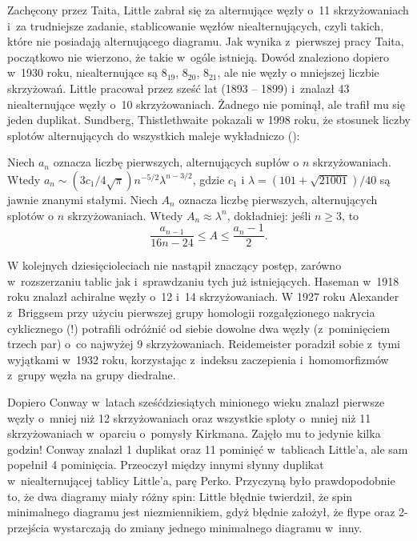 {Zachęcony przez Taita, Little zabrał się za alternujące węzły o~11 skrzyżowaniach i~za trudniejsze zadanie, stablicowanie węzłów niealternujących, czyli takich, które nie posiadają alternującego diagramu.
Jak wynika z~pierwszej pracy Taita, początkowo nie wierzono, że takie w~ogóle istnieją.
Dowód znaleziono dopiero w~1930 roku, niealternujące są $8_{19}$, $8_{20}$, $8_{21}$, ale nie węzły o mniejszej liczbie skrzyżowań.
Little pracował przez sześć lat (1893 -- 1899) i~znalazł 43 niealternujące węzły o~10 skrzyżowaniach.
Żadnego nie pominął, ale trafił mu się jeden duplikat.
Sundberg, Thistlethwaite pokazali w 1998 roku, że stosunek liczby splotów alternujących do wszystkich maleje wykładniczo (\cite{sundberg98}):

\begin{proposition}
    Niech $a_n$ oznacza liczbę pierwszych, alternujących supłów o $n$ skrzyżowaniach.
    Wtedy $a_n \sim (3c_1/4\sqrt{\pi})n^{-5/2}\lambda^{n-3/2}$, gdzie $c_1$ i $\lambda = (101 + \sqrt{21001})/40$ są jawnie znanymi stałymi.
    Niech $A_n$ oznacza liczbę pierwszych, alternujących splotów o $n$ skrzyżowaniach.
    Wtedy $A_n \approx \lambda^n$, dokładniej: jeśli $n \ge 3$, to
    \[
        \frac{a_{n-1}}{16n - 24} \le A \le \frac{a_n - 1}{2}.
    \]
\end{proposition}

W kolejnych dziesięcioleciach nie nastąpił znaczący postęp, zarówno w~rozszerzaniu tablic jak i~sprawdzaniu tych już istniejących.
Haseman w~1918 roku znalazł achiralne węzły o~12 i~14 skrzyżowaniach.
W 1927 roku Alexander z~Briggsem przy użyciu pierwszej grupy homologii rozgałęzionego nakrycia cyklicznego (!) potrafili odróżnić od siebie dowolne dwa węzły (z~pominięciem trzech par) o~co najwyżej 9 skrzyżowaniach.
Reidemeister poradził sobie z~tymi wyjątkami w~1932 roku, korzystając z~indeksu zaczepienia i~homomorfizmów z~grupy węzła na grupy diedralne.


Dopiero Conway w~latach sześćdziesiątych minionego wieku znalazł pierwsze węzły o~mniej niż 12 skrzyżowaniach oraz wszystkie sploty o~mniej niż 11 skrzyżowaniach w~oparciu o~pomysły Kirkmana.
Zajęło mu to jedynie kilka godzin!
Conway znalazł 1 duplikat oraz 11 pominięć w~tablicach Little'a, ale sam popełnił 4 pominięcia.
Przeoczył między innymi słynny duplikat w~niealternującej tablicy Little'a, parę Perko.
Przyczyną było prawdopodobnie to, że dwa diagramy miały różny spin:
Little błędnie twierdził, że spin minimalnego diagramu jest niezmiennikiem, gdyż błędnie założył, że flype oraz 2-przejścia wystarczają do zmiany jednego minimalnego diagramu w~inny.

}
